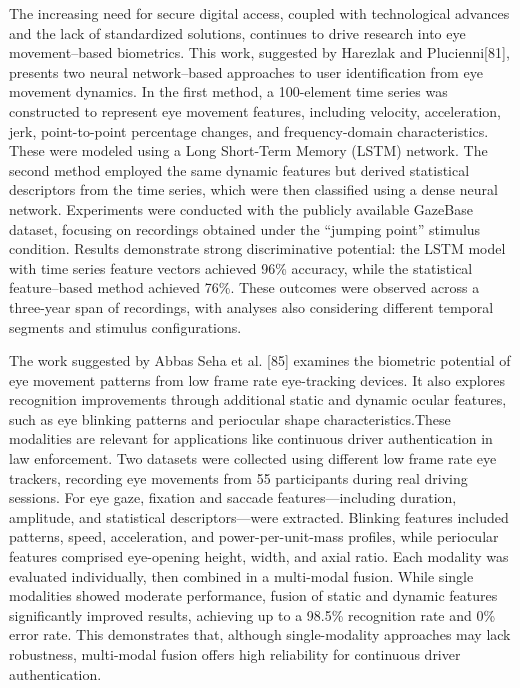 \documentclass[12pt]{report}
\begin{document}
The increasing need for secure digital access, coupled with technological advances and the lack of standardized solutions, continues to drive research into eye movement–based biometrics.
This work, suggested by Harezlak and Plucienni[81], presents two neural network–based approaches to user identification from eye movement dynamics.
In the first method, a 100-element time series was constructed to represent eye movement features, including velocity, acceleration, jerk, point-to-point percentage changes, and frequency-domain characteristics. 
These were modeled using a Long Short-Term Memory (LSTM) network. 
The second method employed the same dynamic features but derived statistical descriptors from the time series, which were then classified using a dense neural network.
Experiments were conducted with the publicly available GazeBase dataset, focusing on recordings obtained under the “jumping point” stimulus condition. 
Results demonstrate strong discriminative potential: the LSTM model with time series feature vectors achieved 96\% accuracy, while the statistical feature–based method achieved 76\%. 
These outcomes were observed across a three-year span of recordings, with analyses also considering different temporal segments and stimulus configurations.

The work suggested by Abbas Seha et al. [85] examines the biometric potential of eye movement patterns from low frame rate eye-tracking devices.
It also explores recognition improvements through additional static and dynamic ocular features, such as eye blinking patterns and periocular shape characteristics.These modalities are relevant for applications like continuous driver authentication in law enforcement. 
Two datasets were collected using different low frame rate eye trackers, recording eye movements from 55 participants during real driving sessions. 
For eye gaze, fixation and saccade features—including duration, amplitude, and statistical descriptors—were extracted.
Blinking features included patterns, speed, acceleration, and power-per-unit-mass profiles, while periocular features comprised eye-opening height, width, and axial ratio. 
Each modality was evaluated individually, then combined in a multi-modal fusion. While single modalities showed moderate performance, fusion of static and dynamic features significantly improved results, achieving up to a 98.5\% recognition rate and 0\% error rate. 
This demonstrates that, although single-modality approaches may lack robustness, multi-modal fusion offers high reliability for continuous driver authentication.
\end{document}
